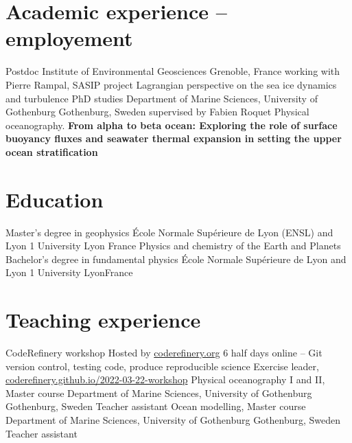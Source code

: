 \documentclass[11pt,a4paper,roman]{moderncv}
\begin{document}
\vspace{.5cm}

\makeletterclosing %

\newpage



\vspace{-0.5cm}

\makecvtitle

\vspace*{-0.5cm}

\section{Academic experience -- employement}
        {Postdoc}
        {Institute of Environmental Geosciences}
        {Grenoble, France}
        {working with Pierre Rampal, SASIP project}
        {Lagrangian perspective on the sea ice dynamics and turbulence}
        {PhD studies}
        {Department of Marine Sciences, University of Gothenburg}
        {Gothenburg, Sweden}
        {supervised by Fabien Roquet}
        {Physical oceanography.
          \textbf{From alpha to beta ocean: Exploring the role of surface buoyancy fluxes and seawater thermal expansion in setting the upper ocean stratification}
        }


\section{Education}
        {Master's degree in geophysics}
        {École Normale Supérieure de Lyon (ENSL) and Lyon 1 University}
        {Lyon}
        {France}
        {Physics and chemistry of the Earth and Planets}
        {Bachelor's degree in fundamental physics}
        {École Normale Supérieure de Lyon and Lyon 1 University}
        {Lyon}{France}{}


        
\section{Teaching experience}
        {CodeRefinery workshop}
        {Hosted by \href{https://coderefinery.org}{coderefinery.org}}
        {6 half days online -- Git version control, testing code, produce reproducible science}
        {Exercise leader, \href{https://coderefinery.github.io/2022-03-22-workshop}{coderefinery.github.io/2022-03-22-workshop}}
        {}
        {Physical oceanography I and II, Master course}
        {Department of Marine Sciences, University of Gothenburg}
        {Gothenburg, Sweden}
        {Teacher assistant}
        {}
        {Ocean modelling, Master course}
        {Department of Marine Sciences, University of Gothenburg}
        {Gothenburg, Sweden}
        {Teacher assistant}
        {}
\end{document}
